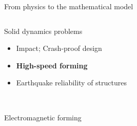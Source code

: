 \begin{frame}{From physics to the mathematical model}
\begin{overprint}
    \begin{figure}[ht]
      \centering
    \end{figure}
    
    \begin{columns}
      \begin{column}{0.45\textwidth}
        \begin{block}{Solid dynamics problems}
          \begin{itemize}
          \item[] Impact; Crash-proof design
          \item[] \textbf{High-speed forming}
          \item[] Earthquake reliability of structures 
          \end{itemize}
        \end{block}
      \end{column}
      
      \begin{column}{0.55\textwidth}
      \end{column}
    \end{columns}
    \centering
      \\
    \scriptsize Electromagnetic forming \cite{Guillaume}
    

\end{overprint}
\end{frame}

